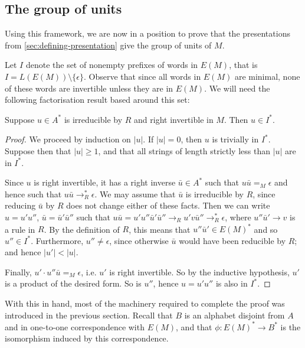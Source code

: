 \documentclass[noindex,noinsetproof,emphthm,12pt]{lmaths}
\begin{document}
\subsection{The group of units} \label{sec:group-of-units}

Using this framework, we are now in a position to prove that the presentations from \cref{sec:defining-presentation} give the group of units of $M$.

Let $I$ denote the set of nonempty prefixes of words in $E(M)$, that is $I = L(E(M)) \setminus \{\epsilon\}$. Observe that since all words in $E(M)$ are minimal, none of these words are invertible unless they are in $E(M)$. We will need the following factorisation result based around this set:

\begin{lemma}
	Suppose $u \in A^*$ is irreducible by $R$ and right invertible in $M$. Then $u \in I^*$. \label{lma:factor-I*}
\end{lemma}
\begin{proof}
	We proceed by induction on $|u|$. If $|u| = 0$, then $u$ is trivially in $I^*$. Suppose then that $|u| \ge 1$, and that all strings of length strictly less than $|u|$ are in $I^*$.

	Since $u$ is right invertible, it has a right inverse $\bar u \in A^*$ such that $u\bar u =_M \epsilon$ and hence such that $u\bar u \to_R^* \epsilon$. We may assume that $\bar u$ is irreducible by $R$, since reducing $\bar u$ by $R$ does not change either of these facts. Then we can write $u = u'u''$, $\bar u = \bar u'\bar u''$ such that $u\bar u = u'u''\bar u'\bar u'' \to_R u'v\bar u'' \to_R^* \epsilon$, where $u''\bar u' \to v$ is a rule in $R$. By the definition of $R$, this means that $u''\bar u' \in E(M)^*$ and so $u'' \in I^*$. Furthermore, $u'' \ne \epsilon$, since otherwise $\bar u$ would have been reducible by $R$; and hence $|u'| < |u|$.

	Finally, $u' \cdot u''\bar u =_M \epsilon$, i.e. $u'$ is right invertible. So by the inductive hypothesis, $u'$ is a product of the desired form. So is $u''$, hence $u = u'u''$ is also in $I^*$.
\end{proof}

With this in hand, most of the machinery required to complete the proof was introduced in the previous section. Recall that $B$ is an alphabet disjoint from $A$ and in one-to-one correspondence with $E(M)$, and that $\phi : E(M)^* \to B^*$ is the isomorphism induced by this correspondence.
\end{document}

